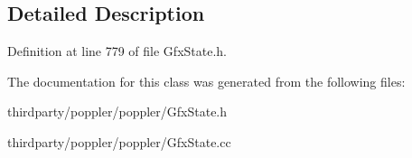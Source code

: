 \subsection{Detailed Description}


Definition at line 779 of file Gfx\+State.\+h.



The documentation for this class was generated from the following files\+:\begin{DoxyCompactItemize}
\item 
thirdparty/poppler/poppler/Gfx\+State.\+h\item 
thirdparty/poppler/poppler/Gfx\+State.\+cc\end{DoxyCompactItemize}
